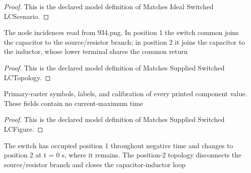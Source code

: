 \begin{proof}
  This is the declared model definition of Matches Ideal Switched LCScenario.
\end{proof}
\begin{definition}
  \label{def:physics:phyx-mini-0934:phyxminiproblems-problemphyxmini0934-matchessuppliedswitchedlctopology}
  The node incidences read from 934.png. In position 1 the switch common joins the capacitor to the source/resistor branch; in position 2 it joins the capacitor to the inductor, whose lower terminal shares the common return
\end{definition}
\begin{proof}
  This is the declared model definition of Matches Supplied Switched LCTopology.
\end{proof}
\begin{definition}
  \label{def:physics:phyx-mini-0934:phyxminiproblems-problemphyxmini0934-matchessuppliedswitchedlcfigure}
  Primary-raster symbols, labels, and calibration of every printed component value. These fields contain no current-maximum time
\end{definition}
\begin{proof}
  This is the declared model definition of Matches Supplied Switched LCFigure.
\end{proof}
\begin{definition}
  \label{def:physics:phyx-mini-0934:phyxminiproblems-problemphyxmini0934-matchesswitchingprotocol}
  The switch has occupied position 1 throughout negative time and changes to position 2 at t = 0 s, where it remains. The position-2 topology disconnects the source/resistor branch and closes the capacitor-inductor loop
\end{definition}
